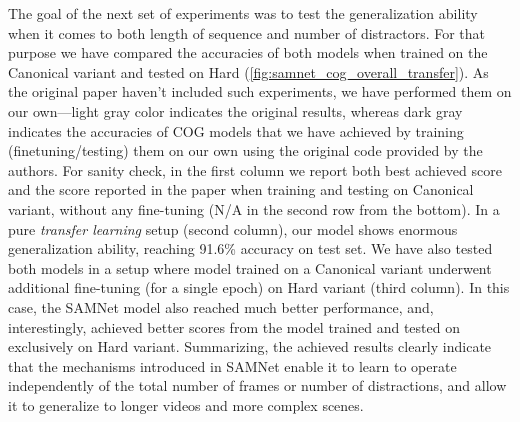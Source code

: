 The goal of the next set of experiments was to test the generalization ability when it comes to both length of sequence and number of distractors.
For that purpose we have compared the accuracies of both models when trained on the Canonical variant and tested on Hard (\cref{fig:samnet_cog_overall_transfer}).
As the original paper haven't included such experiments, we have performed them on our own---light gray color indicates the original results, whereas dark gray indicates the accuracies of COG models that we have achieved by training (finetuning/testing) them on our own using the original code provided by the authors.
For sanity check, in the first column we report both best achieved score and the score reported in the paper when training and testing on Canonical variant, without any fine-tuning (N/A in the second row from the bottom).
In a pure \textit{transfer learning} setup (second column), our model shows enormous generalization ability, reaching 91.6\% accuracy on test set.
We have also tested both models in a setup where model trained on a Canonical variant underwent additional fine-tuning (for a single epoch) on Hard variant (third column).
In this case, the SAMNet model also reached much better performance, and, interestingly, achieved better scores from the model trained and tested on exclusively on Hard variant.
Summarizing, the achieved results clearly indicate that the mechanisms introduced in SAMNet  enable it to learn to operate independently of the total number of frames or number of distractions, and allow it to generalize to longer videos and more complex scenes.






